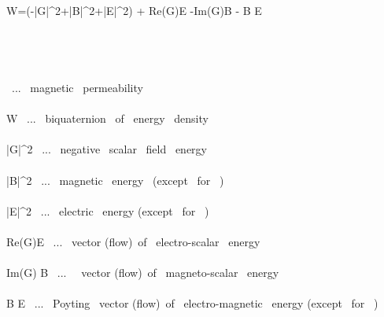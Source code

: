 \mu  \widehat W=(-|G|^2+|\vec B|^2+|\vec E|^2) +\imath {} Re(G)\vec E -\imath Im(G)\vec B - \imath {} \vec B \times \vec E \\\\\\

\\\\

\mu \ ... \ magnetic \ permeability \\\\
\widehat W \ ... \ biquaternion \ of \ energy \ density \\\\
|G|^2 \ ... \  negative \ scalar \ field \ energy \\\\
|\vec B|^2 \ ... \ magnetic \ energy \ (except \ for \ \mu) \\\\
|\vec E|^2 \ ... \ electric \ energy (except \ for \ \mu) \\\\
 Re(G)\vec E \ ... \ vector (flow)\ of \ electro-scalar \ energy \\\\
Im(G) \vec B \ ... \ \ vector (flow)\ of \ magneto-scalar \ energy \\\\
 \vec B \times \vec E \ ... \ Poyting \ vector (flow)\ of \ electro-magnetic \ energy (except \ for \ \mu)
